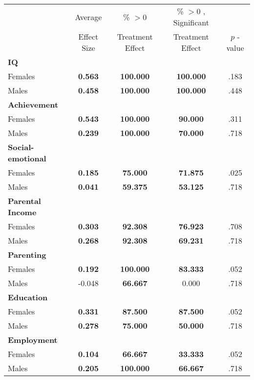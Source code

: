 \begin{tabular}{l c c c c}
\toprule
 & Average & \% $ >0 $ & \% $ >0 $ , Significant & \citet{Rosenbaum_2005_Distribution_JRSS} \\
 & Effect Size & Treatment Effect & Treatment Effect & $ p $ -value \\
\midrule
\textbf{IQ} & & & & \\
\quad Females &  \textbf{    0.563} & \textbf{  100.000} & \textbf{  100.000} & .183 \\
\quad Males &  \textbf{    0.458} & \textbf{  100.000} & \textbf{  100.000} & .448 \\
\midrule
\textbf{Achievement} & & & & \\
\quad Females &  \textbf{    0.543} & \textbf{  100.000} & \textbf{   90.000} & .311 \\
\quad Males &  \textbf{    0.239} & \textbf{  100.000} & \textbf{   70.000} & .718 \\
\midrule
\textbf{Social-emotional} & & & & \\
\quad Females &  \textbf{    0.185} & \textbf{   75.000} & \textbf{   71.875} & .025 \\
\quad Males &  \textbf{    0.041} & \textbf{   59.375} & \textbf{   53.125} & .718 \\
\midrule
\textbf{Parental Income} & & & & \\
\quad Females &  \textbf{    0.303} & \textbf{   92.308} & \textbf{   76.923} & .708 \\
\quad Males &  \textbf{    0.268} & \textbf{   92.308} & \textbf{   69.231} & .718 \\
\midrule
\textbf{Parenting} & & & & \\
\quad Females &  \textbf{    0.192} & \textbf{  100.000} & \textbf{   83.333} & .052 \\
\quad Males &     -0.048 & \textbf{   66.667} &     0.000 & .718 \\
\midrule
\textbf{Education} & & & & \\
\quad Females &  \textbf{    0.331} & \textbf{   87.500} & \textbf{   87.500} & .052 \\
\quad Males &  \textbf{    0.278} & \textbf{   75.000} & \textbf{   50.000} & .718 \\
\midrule
\textbf{Employment} & & & & \\
\quad Females &  \textbf{    0.104} & \textbf{   66.667} & \textbf{   33.333} & .052 \\
\quad Males &  \textbf{    0.205} & \textbf{  100.000} & \textbf{   66.667} & .718 \\

\end{tabular}
